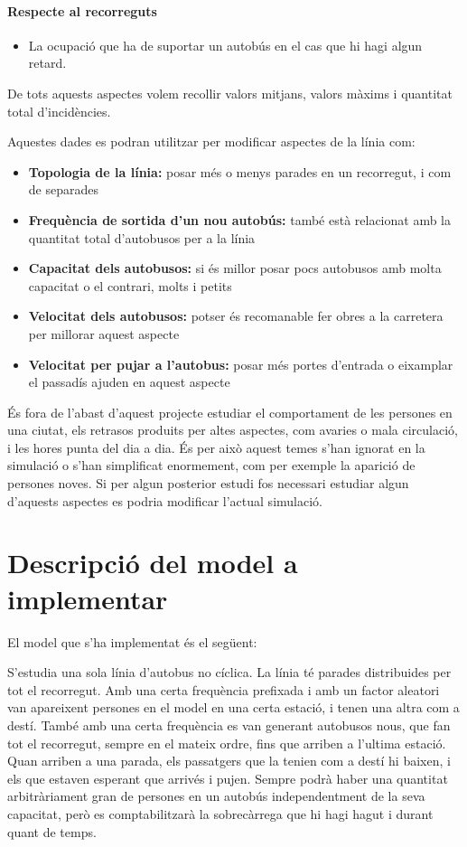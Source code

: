 \documentclass[a4paper,10pt]{article}
\begin{document}
\paragraph{Respecte al recorreguts}
\begin{itemize}
 \item La ocupació que ha de suportar un autobús en el cas que hi hagi algun retard.
\end{itemize}

De tots aquests aspectes volem recollir valors mitjans, valors màxims i quantitat total d'incidències.

Aquestes dades es podran utilitzar per modificar aspectes de la línia com:
\begin{itemize}
 \item \textbf{Topologia de la línia:} posar més o menys parades en un recorregut, i com de separades
 \item \textbf{Frequència de sortida d'un nou autobús:} també està relacionat amb la quantitat total d'autobusos per a la línia
 \item \textbf{Capacitat dels autobusos:} si és millor posar pocs autobusos amb molta capacitat o el contrari, molts i petits
 \item \textbf{Velocitat dels autobusos:} potser és recomanable fer obres a la carretera per millorar aquest aspecte
 \item \textbf{Velocitat per pujar a l'autobus:} posar més portes d'entrada o eixamplar el passadís ajuden en aquest aspecte
\end{itemize}

És fora de l'abast d'aquest projecte  estudiar el comportament de les persones en una ciutat, els retrasos produits per altes aspectes, com avaries o mala circulació, i les hores punta del dia a dia. És per això aquest temes s'han ignorat en la simulació o s'han simplificat enormement, com per exemple la aparició de persones noves. Si per algun posterior estudi fos necessari estudiar algun d'aquests aspectes es podria modificar l'actual simulació.


\section{Descripció del model a implementar}

El model que s'ha implementat és el següent:

S'estudia una sola línia d'autobus no cíclica. La línia té parades distribuides per tot el recorregut. Amb una certa frequència prefixada i amb un factor aleatori van apareixent persones en el model en una certa estació, i tenen una altra com a destí. També amb una certa frequència es van generant autobusos nous, que fan tot el recorregut, sempre en el mateix ordre, fins que arriben a l'ultima estació. Quan arriben a una parada, els passatgers que la tenien com a destí hi baixen, i els que estaven esperant que arrivés i pujen. Sempre podrà haber una quantitat arbitràriament gran de persones en un autobús independentment de la seva capacitat, però es comptabilitzarà la sobrecàrrega que hi hagi hagut i durant quant de temps.
\end{document}
